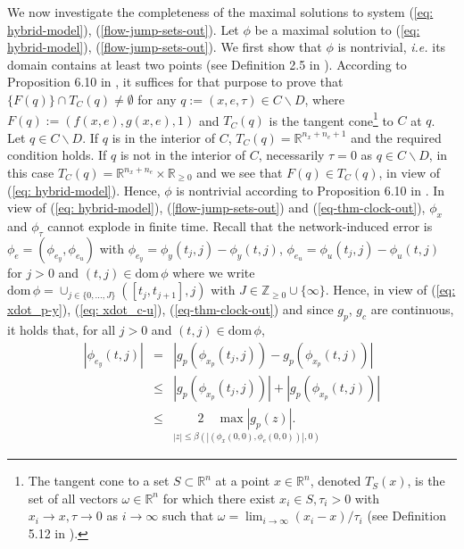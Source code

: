\documentclass[a4paper, 9pt, twocolumn]{IEEEtran}
\theoremstyle{plain}
\theoremstyle{definition}
\newcommand{\dom}{\ensuremath{\text{dom}\,}}
\newcommand{\R}[2]{\ensuremath{\mathbb{R}^{#1}_{#2}}}
\newcommand{\Zp}{\ensuremath{\mathbb{Z}_{\geq 0}}}
\begin{document}
We now investigate the completeness of the maximal solutions to system (\ref{eq: hybrid-model}), (\ref{flow-jump-sets-out}). Let $\phi$ be a maximal solution to (\ref{eq: hybrid-model}), (\ref{flow-jump-sets-out}). We first show that $\phi$ is nontrivial, \textit{i.e.} its domain contains at least two points (see Definition 2.5 in \cite{Teel}). According to Proposition 6.10 in \cite{Teel}, it suffices for that purpose to prove that $\{F(q)\}\cap T_{C}(q) \neq \emptyset$ for any $q := (x,e,\tau)\in C\backslash D$, where $F(q) := (f(x,e), g(x,e), 1)$ and $T_{C}(q)$ is the tangent cone\footnote{The tangent cone to a set $S\subset \R{n}{}$ at a point $x\in\R{n}{}$, denoted $T_{S}(x)$, is the set of all vectors $\omega\in\R{n}{}$ for which there exist $x_{i}\in S, \tau_{i}>0$ with $x_{i}\rightarrow x, \tau \rightarrow 0$ as $i \rightarrow \infty$ such that $\omega = \lim_{i\rightarrow \infty} (x_{i} - x)/\tau_{i}$ (see Definition 5.12 in \cite{Teel}).} to $C$ at $q$. Let $q\in C\backslash D$. If $q$ is in the interior of $C$, $T_{C}(q) = \R{n_{x} + n_{e} + 1}{}$ and the required condition holds. If $q$ is not in the interior of $C$, necessarily $\tau = 0$ as $q\in C\backslash D$, in this case $T_{C}(q) = \R{n_{x}+ n_{e}}{}\times \R{}{\geq0}$ and we see that $F(q) \in T_{C}(q)$, in view of (\ref{eq: hybrid-model}). Hence, $\phi$ is nontrivial according to Proposition 6.10 in \cite{Teel}. In view of (\ref{eq: hybrid-model}), (\ref{flow-jump-sets-out}) and (\ref{eq-thm-clock-out}), $\phi_{x}$ and $\phi_{\tau}$ cannot explode in finite time. Recall that the network-induced error is  $\phi_{e} = (\phi_{e_{y}}, \phi_{e_{u}})$ with $\phi_{e_{y}} = \phi_{y}(t_{j},j) - \phi_{y}(t,j)$, $\phi_{e_{u}} = \phi_{u}(t_{j},j) - \phi_{u}(t,j)$ for $j > 0$ and $(t,j)\in \dom \phi$ where we write $\dom \phi = \cup_{j\in\{0,...,J\}}([t_{j}, t_{j+1}], j)$ with $J\in\Zp\cup\{\infty\}$. Hence, in view of (\ref{eq: xdot_p-y}), (\ref{eq: xdot_c-u}), (\ref{eq-thm-clock-out}) and since $g_{p}$, $g_{c}$ are continuous, it holds that, for all $j > 0$ and $(t,j) \in \dom \phi$,
\begin{equation}\label{ey-bound}
\begin{array}{lcl}
  |\phi_{e_{y}}(t,j)| &=& |g_{p}(\phi_{x_{p}}(t_{j},j)) - g_{p}(\phi_{x_{p}}(t,j))| \\[6pt]
                      &\leq& |g_{p}(\phi_{x_{p}}(t_{j},j))| + |g_{p}(\phi_{x_{p}}(t,j))| \\[6pt]
                      &\leq& \underset{|z|\leq\beta(|(\phi_{x}(0,0), \phi_{e}(0,0))|, 0)}{2\hspace{12pt}\max|g_{p}(z)|.}
\end{array}
\end{equation}
\end{document}

